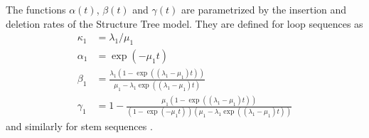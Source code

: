 \documentclass[10pt]{article}
\begin{document}
The functions $\alpha(t)$, $\beta(t)$ and $\gamma(t)$ are parametrized by the insertion and deletion rates of the Structure Tree model.
They are defined for loop sequences as
\begin{align}
  \kappa_1 &= \lambda_1 / \mu_1 \\
  \alpha_1 &= \exp \left( -\mu_1 t \right) \\
  \beta_1 &= \frac{\lambda_1 \left( 1 - \exp \left((\lambda_1 - \mu_1) t \right) \right)}{\mu_1 - \lambda_1 \exp \left( (\lambda_1 - \mu_1) t \right) } \\
  \gamma_1 &= 1 - \frac{\mu_1 \left( 1 - \exp \left((\lambda_1 - \mu_1) t \right) \right)}{\left( 1 - \exp (- \mu_1 t) \right) \left(\mu_1 - \lambda_1 \exp \left( (\lambda_1 - \mu_1) t \right) \right) }
\end{align}
and similarly for stem sequences \cite{Holmes2004}.
\end{document}
